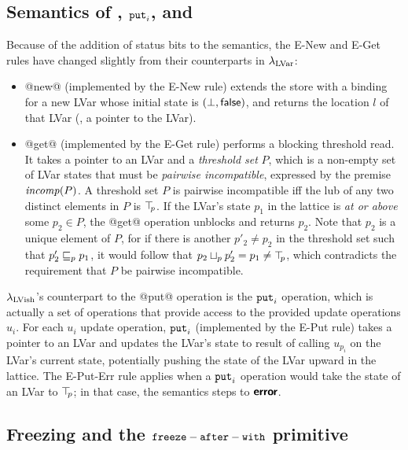 \subsection{Semantics of , $\mbox{\texttt{put}}_i$, and }\label{subsection:quasi-semantics-of-new-put-and-get}

Because of the addition of status bits to the semantics, the {\sc
  E-New} and {\sc E-Get} rules have changed slightly from their
counterparts in $\lambda_{\textrm{LVar}}$:

\begin{itemize}
\item @new@ (implemented by the {\sc E-New} rule) extends the store
  with a binding for a new LVar whose initial state is $(\bot,
  \textsf{false})$, and returns the location $l$ of that LVar (\ie, a
  pointer to the LVar).
\item @get@ (implemented by the {\sc E-Get} rule) performs a blocking
  threshold read.  It takes a pointer to an LVar and a \emph{threshold
    set} $P$, which is a non-empty set of LVar states that must be
  \emph{pairwise incompatible}, expressed by the premise $\mathit{incomp}(P)$.
  A threshold set $P$ is pairwise incompatible iff the lub of any two
  distinct elements in $P$ is $\top\hspace{-0.85mm}_{p}$.  If the LVar's state $p_1$ in
  the lattice is \emph{at or above} some $p_2 \in P$, the @get@
  operation unblocks and returns $p_2$.  Note that $p_2$ is a unique
  element of $P$, for if there is another $p'_2 \neq p_2$ in the
  threshold set such that $p'_2 \sqsubseteq_p p_1$, it would follow that
  $p_2 \sqcup_p p'_2 = p_1 \neq \top\hspace{-0.85mm}_{p}$, which contradicts the
  requirement that $P$ be pairwise incompatible.
\end{itemize}

$\lambda_{\textrm{LVish}}$'s counterpart to the @put@ operation is the $\mbox{\texttt{put}}_i$
operation, which is actually a set of operations that provide access
to the provided update operations $u_i$.  For each $u_i$ update
operation, $\mbox{\texttt{put}}_i$ (implemented by the {\sc E-Put} rule) takes a
pointer to an LVar and updates the LVar's state to result of calling
$u_{p_i}$ on the LVar's current state, potentially pushing the state
of the LVar upward in the lattice.  The {\sc E-Put-Err} rule applies
when a $\mbox{\texttt{put}}_i$ operation would take the state of an LVar to $\top\hspace{-0.85mm}_{p}$;
in that case, the semantics steps to $\textbf{\textsf{error}}$.

\subsection{Freezing and the ${\mbox{\texttt{freeze}}-\mbox{\texttt{after}}-\mbox{\texttt{with}}}$ primitive}\label{subsection:quasi-freezing}


